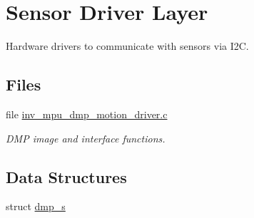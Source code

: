 \hypertarget{group___d_r_i_v_e_r_s}{}\section{Sensor Driver Layer}
\label{group___d_r_i_v_e_r_s}


Hardware drivers to communicate with sensors via I2C.  


\subsection*{Files}
\begin{DoxyCompactItemize}
\item 
file \hyperlink{inv__mpu__dmp__motion__driver_8c}{inv\+\_\+mpu\+\_\+dmp\+\_\+motion\+\_\+driver.\+c}
\begin{DoxyCompactList}\small\item\em D\+MP image and interface functions. \end{DoxyCompactList}\end{DoxyCompactItemize}
\subsection*{Data Structures}
\begin{DoxyCompactItemize}
\item 
struct \hyperlink{structdmp__s}{dmp\+\_\+s}
\end{DoxyCompactItemize}
